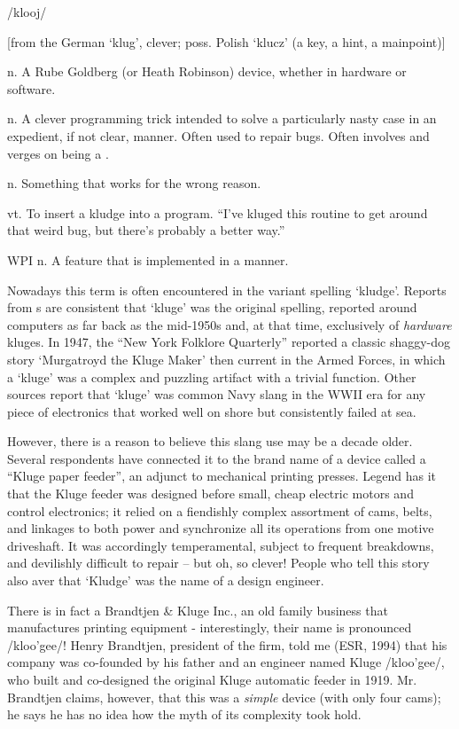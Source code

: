 /klooj/

[from the German `klug', clever; poss. Polish `klucz' (a key, a hint, a mainpoint)]
\begin{inparaenum}
	\item n. A Rube Goldberg (or Heath Robinson) device, whether in hardware or software.
	\item n. A clever programming trick intended to solve a particularly nasty case in an expedient, if not clear, manner. Often used to repair bugs. Often involves  and verges on being a .
	\item n. Something that works for the wrong reason.
	\item vt. To insert a kludge into a program. ``I've kluged this routine to get around that weird bug, but there's probably a better way.''
	\item [WPI]  n. A feature that is implemented in a  manner.
\end{inparaenum}

Nowadays this term is often encountered in the variant spelling `kludge'. Reports from s are consistent that `kluge' was the original spelling, reported around computers as far back as the mid-1950s and, at that time, exclusively of \textit{hardware} kluges. In 1947, the ``New York Folklore Quarterly'' reported a classic shaggy-dog story `Murgatroyd the Kluge Maker' then current in the Armed Forces, in which a `kluge' was a complex and puzzling artifact with a trivial function. Other sources report that `kluge' was common Navy slang in the WWII era for any piece of electronics that worked well on shore but consistently failed at sea.

However, there is a reason to believe this slang use may be a decade older. Several respondents have connected it to the brand name of a device called a ``Kluge paper feeder'', an adjunct to mechanical printing presses. Legend has it that the Kluge feeder was designed before small, cheap electric motors and control electronics; it relied on a fiendishly complex assortment of cams, belts, and linkages to both power and synchronize all its operations from one motive driveshaft. It was accordingly temperamental, subject to frequent breakdowns, and devilishly difficult to repair -- but oh, so clever! People who tell this story also aver that `Kludge' was the name of a design engineer.

There is in fact a Brandtjen \& Kluge Inc., an old family business that manufactures printing equipment - interestingly, their name is pronounced /kloo'gee/! Henry Brandtjen, president of the firm, told me (ESR, 1994) that his company was co-founded by his father and an engineer named Kluge /kloo'gee/, who built and co-designed the original Kluge automatic feeder in 1919. Mr. Brandtjen claims, however, that this was a \textit{simple} device (with only four cams); he says he has no idea how the myth of its complexity took hold.

